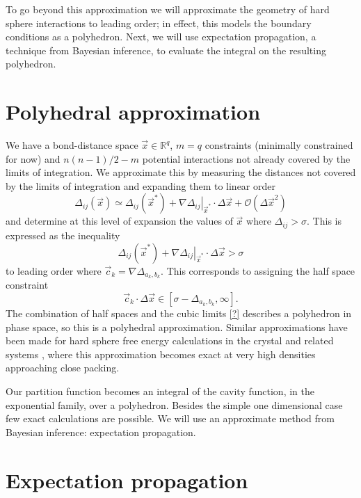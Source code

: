 \documentclass[11pt,twoside]{report}
\begin{document}
To go beyond this approximation we will approximate the geometry of hard sphere interactions to leading order; in effect, this models the boundary conditions as a polyhedron.
Next, we will use expectation propagation, a technique from Bayesian inference, to evaluate the integral on the resulting polyhedron.

\section{Polyhedral approximation}

We have a bond-distance space $\vec{x} \in \mathbb{R}^q$, $m = q$ constraints (minimally constrained for now) and $n(n-1)/2 - m$ potential interactions not already covered by the limits of integration.
We approximate this by measuring the distances not covered by the limits of integration and expanding them to linear order
\begin{equation}
  \Delta_{ij}(\vec{x})
  \simeq
  \Delta_{ij}(\vec{x}^*)
  + \left. \nabla \Delta_{ij} \right|_{\vec{x}^*} \cdot \Delta \vec{x}
  + \mathcal{O}(\Delta \vec{x}^2)
\end{equation}
and determine at this level of expansion the values of $\vec{x}$ where $\Delta_{ij} > \sigma$.
This is expressed as the inequality
\begin{equation}
  \Delta_{ij}(\vec{x}^*)
  + \left. \nabla \Delta_{ij} \right|_{\vec{x}^*} \cdot \Delta \vec{x}
  > \sigma
\end{equation}
to leading order where $\vec{c}_k = \nabla \Delta_{a_k,b_k}$.
This corresponds to assigning the half space constraint
\begin{equation}
  \vec{c}_k \cdot \Delta \vec{x} \in [\sigma - \Delta_{a_k,b_k}, \infty].
\end{equation}
The combination of half spaces and the cubic limits \eqref{?} describes a polyhedron in phase space, so this is a polyhedral approximation.
Similar approximations have been made for hard sphere free energy calculations in the crystal \cite{RadinPRL2005,KochPRE2005} and related systems \cite{LeoniPRL2017}, where this approximation becomes exact at very high densities approaching close packing.

Our partition function becomes an integral of the cavity function, in the exponential family, over a polyhedron.
Besides the simple one dimensional case few exact calculations are possible.
We will use an approximate method from Bayesian inference: expectation propagation.

\section{Expectation propagation}
\end{document}
